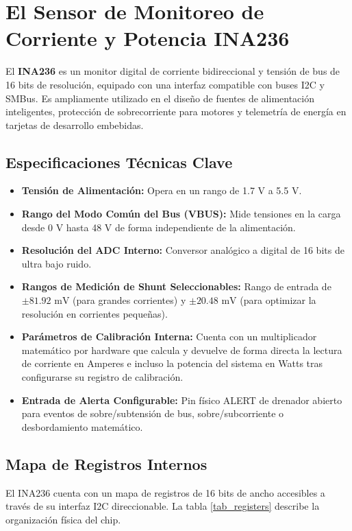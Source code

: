 \documentclass[
10pt, %
a4paper, %
oneside, %
headinclude,footinclude, %
BCOR5mm, %
]{scrartcl}
\begin{document}
\newpage
\section{El Sensor de Monitoreo de Corriente y Potencia INA236}

El \textbf{INA236} es un monitor digital de corriente bidireccional y tensión de bus de 16 bits de resolución, equipado con una interfaz compatible con buses I2C y SMBus. Es ampliamente utilizado en el diseño de fuentes de alimentación inteligentes, protección de sobrecorriente para motores y telemetría de energía en tarjetas de desarrollo embebidas.

\subsection{Especificaciones Técnicas Clave}
\begin{itemize}
	\item \textbf{Tensión de Alimentación:} Opera en un rango de 1.7 V a 5.5 V.
	\item \textbf{Rango del Modo Común del Bus (VBUS):} Mide tensiones en la carga desde 0 V hasta 48 V de forma independiente de la alimentación.
	\item \textbf{Resolución del ADC Interno:} Conversor analógico a digital de 16 bits de ultra bajo ruido.
	\item \textbf{Rangos de Medición de Shunt Seleccionables:} Rango de entrada de $\pm 81.92\text{ mV}$ (para grandes corrientes) y $\pm 20.48\text{ mV}$ (para optimizar la resolución en corrientes pequeñas).
	\item \textbf{Parámetros de Calibración Interna:} Cuenta con un multiplicador matemático por hardware que calcula y devuelve de forma directa la lectura de corriente en Amperes e incluso la potencia del sistema en Watts tras configurarse su registro de calibración.
	\item \textbf{Entrada de Alerta Configurable:} Pin físico ALERT de drenador abierto para eventos de sobre/subtensión de bus, sobre/subcorriente o desbordamiento matemático.
\end{itemize}

\subsection{Mapa de Registros Internos}
El INA236 cuenta con un mapa de registros de 16 bits de ancho accesibles a través de su interfaz I2C direccionable. La tabla \ref{tab_registers} describe la organización física del chip.
\end{document}

